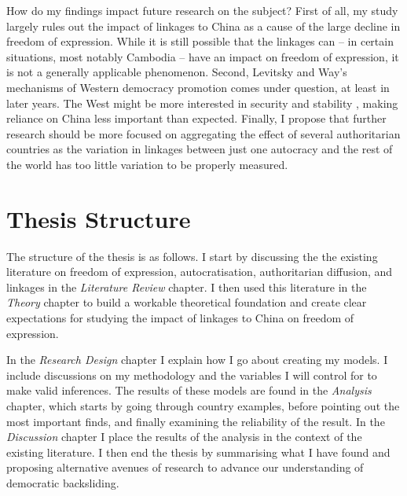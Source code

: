 How do my findings impact future research on the subject? First of all, my study largely rules out the impact of linkages to China as a cause of the large decline in freedom of expression. While it is still possible that the linkages can -- in certain situations, most notably Cambodia -- have an impact on freedom of expression, it is not a generally applicable phenomenon. Second, Levitsky and Way's \citeyear{levitsky_linkage_2006} mechanisms of Western democracy promotion comes under question, at least in later years. The West might be more interested in security and stability \citep{borzel_noble_2015, delcour_spoiler_2015, freyburg_local_2015}, making reliance on China less important than expected. Finally, I propose that further research should be more focused on aggregating the effect of several authoritarian countries as the variation in linkages between just one autocracy and the rest of the world has too little variation to be properly measured.

\section{Thesis Structure}
The structure of the thesis is as follows. I start by discussing the the existing literature on freedom of expression, autocratisation, authoritarian diffusion, and linkages in the \textit{Literature Review} chapter. I then used this literature in the \textit{Theory} chapter to build a workable theoretical foundation and create clear expectations for studying the impact of linkages to China on freedom of expression.

In the \textit{Research Design} chapter I explain how I go about creating my models. I include discussions on my methodology and the variables I will control for to make valid inferences. The results of these models are found in the \textit{Analysis} chapter, which starts by going through country examples, before pointing out the most important finds, and finally examining the reliability of the result. In the \textit{Discussion} chapter I place the results of the analysis in the context of the existing literature. I then end the thesis by summarising what I have found and proposing alternative avenues of research to advance our understanding of democratic backsliding.
